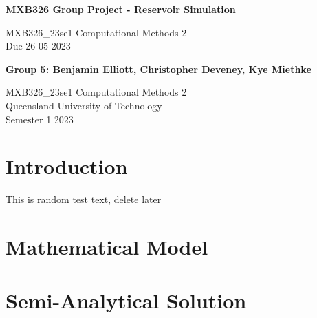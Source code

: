 \documentclass[11pt]{article}
\begin{document}

\begin{titlepage}
   \begin{center}
       \vspace*{6cm}

       \begin{large}\textbf{MXB326 Group Project - Reservoir Simulation}\end{large}

       \vspace{0.5cm}
        MXB326\_23se1 Computational Methods 2\\
        Due 26-05-2023
            
       \vspace{1.5cm}

       \textbf{Group 5: Benjamin Elliott, Christopher Deveney, Kye Miethke}

       \vfill
            
       MXB326\_23se1 Computational Methods 2\\
       Queensland University of Technology\\
       Semester 1 2023
            
   \end{center}
\end{titlepage}
\newpage


\tableofcontents
\newpage
{}


\section{Introduction}
This is random test text, delete later
\newpage
\section{Mathematical Model}

\newpage
\section{Semi-Analytical Solution}

\newpage
\end{document}
